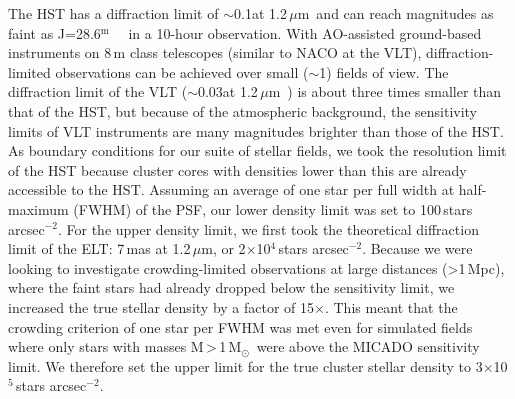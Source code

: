 \documentclass{aa}
\newcommand{\m}{$^\mathrm{m}$~}
\newcommand{\um}{$\mu$m~}
\newcommand{\ume}{$\mu$m}
\newcommand{\msun}{M$_\odot$~}
\newcommand{\s}{$\sim$}
\newcommand{\h}[1]{$^{#1}$}
\newcommand{\spae}{stars arcsec$^{-2}$}
\begin{document}
The HST has a diffraction limit of \s0.1\arcsec at 1.2\,\um and can reach magnitudes as faint as J=28.6\m~\citep{hst_wfc3} in a 10-hour observation.
With AO-assisted ground-based instruments on 8\,m class telescopes (similar to NACO at the VLT), diffraction-limited observations can be achieved over small (\s1\arcmin) fields of view.
The diffraction limit of the VLT (\s0.03\arcsec at 1.2\,\um) is about three times smaller than that of the HST, but because of the atmospheric background, the sensitivity limits of VLT instruments are many magnitudes brighter than those of the HST\@.
As boundary conditions for our suite of stellar fields, we took the resolution limit of the HST because cluster cores with densities lower than this are already accessible to the HST\@.
Assuming an average of one star per full width at half-maximum (FWHM) of the PSF, our lower density limit was set to 100\,\spae.
For the upper density limit, we first took the theoretical diffraction limit of the ELT: 7\,mas at 1.2\,\ume, or 2$\times$10\h4\,\spae.
Because we were looking to investigate crowding-limited observations at large distances (\textgreater1\,Mpc), where the faint stars had already dropped below the sensitivity limit, we increased the true stellar density by a factor of 15$\times$.
This meant that the crowding criterion of one star per FWHM was met even for simulated fields where only stars with masses M\,\textgreater\,1\,\msun were above the MICADO sensitivity limit.
We therefore set the upper limit for the true cluster stellar density to 3$\times$10\h5\,\spae.
\end{document}
